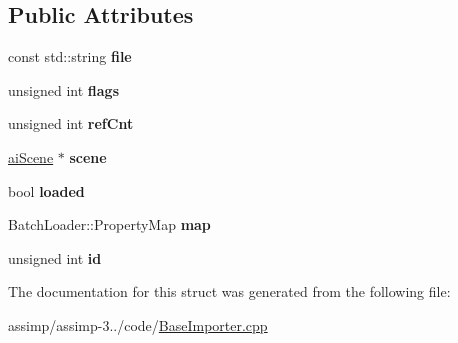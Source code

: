 \subsection*{Public Attributes}
\begin{DoxyCompactItemize}
\item 
\hypertarget{struct_assimp_1_1_load_request_aaf66d25ff97339aeaf8dc8679184931a}{const std\+::string {\bfseries file}}\label{struct_assimp_1_1_load_request_aaf66d25ff97339aeaf8dc8679184931a}

\item 
\hypertarget{struct_assimp_1_1_load_request_a6a28ac165b5c4f6dceefe518a562dc5f}{unsigned int {\bfseries flags}}\label{struct_assimp_1_1_load_request_a6a28ac165b5c4f6dceefe518a562dc5f}

\item 
\hypertarget{struct_assimp_1_1_load_request_a5f9b00106b708c909239639f141f4005}{unsigned int {\bfseries ref\+Cnt}}\label{struct_assimp_1_1_load_request_a5f9b00106b708c909239639f141f4005}

\item 
\hypertarget{struct_assimp_1_1_load_request_ab4e563bedda12383c2713eb161e1b20c}{\hyperlink{structai_scene}{ai\+Scene} $\ast$ {\bfseries scene}}\label{struct_assimp_1_1_load_request_ab4e563bedda12383c2713eb161e1b20c}

\item 
\hypertarget{struct_assimp_1_1_load_request_a171ee8fc16f9e06ba42005285d655b83}{bool {\bfseries loaded}}\label{struct_assimp_1_1_load_request_a171ee8fc16f9e06ba42005285d655b83}

\item 
\hypertarget{struct_assimp_1_1_load_request_a0b87e94d2511b11be3aaca68b8c55000}{Batch\+Loader\+::\+Property\+Map {\bfseries map}}\label{struct_assimp_1_1_load_request_a0b87e94d2511b11be3aaca68b8c55000}

\item 
\hypertarget{struct_assimp_1_1_load_request_a1b982065e9d451aa2b67722de8d8a0b0}{unsigned int {\bfseries id}}\label{struct_assimp_1_1_load_request_a1b982065e9d451aa2b67722de8d8a0b0}

\end{DoxyCompactItemize}


The documentation for this struct was generated from the following file\+:\begin{DoxyCompactItemize}
\item 
assimp/assimp-\/3../code/\hyperlink{_base_importer_8cpp}{Base\+Importer.\+cpp}\end{DoxyCompactItemize}
